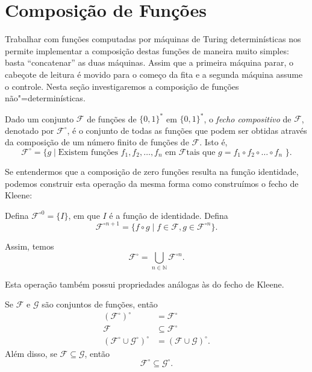 \section{Composição de Funções}

Trabalhar com funções computadas por máquinas de Turing determinísticas
nos permite implementar a composição destas funções de maneira muito simples:
basta ``concatenar'' as duas máquinas.
Assim que a primeira máquina parar,
o cabeçote de leitura é movido para o começo da fita
e a segunda máquina assume o controle.
Nesta seção investigaremos a composição de funções não"=determinísticas.

\begin{definition}
    Dado um conjunto $\mathcal F$ de funções de $\{0, 1\}^*$ em $\{0, 1\}^*$,
    o \emph{fecho compositivo} de $\mathcal F$,
    denotado por $\mathcal F^\circ$,
    é o conjunto de todas as funções que podem ser obtidas
    através da composição de um número finito de funções de $\mathcal F$.
    Isto é,
    \begin{equation*}
        \mathcal F^\circ = \{g \mid
            \text{Existem funções $f_1, f_2, \dots, f_n$ em $\mathcal F$
                tais que $g = f_1 \circ f_2 \circ \dots \circ f_n$
            }
        \}.
    \end{equation*}
\end{definition}

Se entendermos que a composição de zero funções resulta
na função identidade,
podemos construir esta operação da mesma forma como construímos o fecho de Kleene:

Defina $\mathcal F^{\circ 0} = \{I\}$,
em que $I$ é a função de identidade.
Defina
\begin{equation*}
    \mathcal F^{\circ n+1} = \{ f \circ g \mid
        f \in \mathcal F, g \in \mathcal F^{\circ n}
    \}.
\end{equation*}

Assim, temos
\begin{equation*}
    \mathcal F^\circ = \bigcup_{n \in \mathbb N} \mathcal F^{\circ n}.
\end{equation*}

Esta operação também possui propriedades análogas às do fecho de Kleene.

\begin{proposition}
    Se $\mathcal F$ e $\mathcal G$ são conjuntos de funções, então
    \begin{align*}
        (\mathcal F^\circ)^\circ &= \mathcal F^\circ \\
        \mathcal F &\subseteq \mathcal F^\circ \\
        (\mathcal F^\circ \cup \mathcal G^\circ)^\circ &=
            (\mathcal F \cup \mathcal G)^\circ.
    \end{align*}
    Além disso, se $\mathcal F \subseteq \mathcal G$,
    então
    \begin{equation*}
        \mathcal F^\circ \subseteq \mathcal G^\circ.
    \end{equation*}
    \label{thm:compositive_closure_properties}
\end{proposition}


